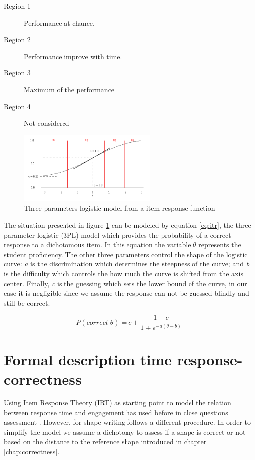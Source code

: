 \begin{description}
  \item[Region 1] Performance at chance.
  \item[Region 2] Performance improve with time.
  \item[Region 3] Maximum of the performance
  \item[Region 4] Not considered
\end{description}

\begin{figure}[h!]
        \centering
        \includegraphics[width=0.6\textwidth]{figures/3PL.png}
        \caption{Three parameters logistic model from a item response function}
        \label{fig:3pl}
\end{figure}

The situation presented in figure \ref{fig:3pl} can be modeled by equation \ref{eq:itr}, the three parameter logistic (3PL) model which provides the probability of a correct response to a dichotomous item. In this equation the variable $\theta$ represents the student proficiency. The other three parameters control the shape of the logistic curve: \textit{a} is the discrimination which determines the steepness of the curve; and \textit{b} is the difficulty which controls the how much the curve is shifted from the axis center. Finally, \textit{c} is the guessing which sets the lower bound of the curve, in our case it is negligible since we assume the response can not be guessed blindly and still be correct.

\begin{equation}\label{eq:itr}
P(correct|\theta) = c + \frac{1-c}{1 + e^{-a(\theta-b)}}
\end{equation}

\section{Formal description time response-correctness }

Using Item Response Theory (IRT) \cite{embretson2013item} as starting point to model the relation between response time and engagement has used before in close questions assessment \cite{joseph2005engagement}. However, for shape writing follows a different procedure. In order to simplify the model we assume a dichotomy to assess if a shape is correct or not based on the distance to the reference shape introduced in chapter \ref{chap:correctness}.

